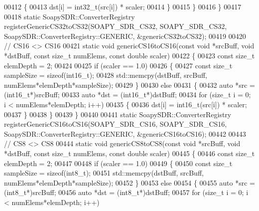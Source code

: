 \begin{DoxyCode}
00412     \{
00413       dst[i] = int32\_t(src[i]) * scaler;
00414     \}
00415     \}
00416 \}
00417 
00418 \textcolor{keyword}{static} SoapySDR::ConverterRegistry registerGenericCS32toCS32(SOAPY_SDR_CS32, 
      SOAPY_SDR_CS32, SoapySDR::ConverterRegistry::GENERIC, &genericCS32toCS32);
00419 
00420 \textcolor{comment}{// CS16 <> CS16}
00421 \textcolor{keyword}{static} \textcolor{keywordtype}{void} genericCS16toCS16(\textcolor{keyword}{const} \textcolor{keywordtype}{void} *srcBuff, \textcolor{keywordtype}{void} *dstBuff, \textcolor{keyword}{const} \textcolor{keywordtype}{size\_t} numElems, \textcolor{keyword}{const} \textcolor{keywordtype}{double} 
      scaler)
00422 \{
00423   \textcolor{keyword}{const} \textcolor{keywordtype}{size\_t} elemDepth = 2;
00424 
00425   \textcolor{keywordflow}{if} (scaler == 1.0)
00426     \{
00427       \textcolor{keyword}{const} \textcolor{keywordtype}{size\_t} sampleSize = \textcolor{keyword}{sizeof}(int16\_t);
00428       std::memcpy(dstBuff, srcBuff, numElems*elemDepth*sampleSize);
00429     \}
00430   \textcolor{keywordflow}{else}
00431     \{
00432       \textcolor{keyword}{auto} *src = (int16\_t*)srcBuff;
00433       \textcolor{keyword}{auto} *dst = (int16\_t*)dstBuff;
00434       \textcolor{keywordflow}{for} (\textcolor{keywordtype}{size\_t} i = 0; i < numElems*elemDepth; i++)
00435     \{
00436       dst[i] = int16\_t(src[i]) * scaler;
00437     \}
00438     \}
00439 \}
00440 
00441 \textcolor{keyword}{static} SoapySDR::ConverterRegistry registerGenericCS16toCS16(SOAPY_SDR_CS16, 
      SOAPY_SDR_CS16, SoapySDR::ConverterRegistry::GENERIC, &genericCS16toCS16);
00442 
00443 \textcolor{comment}{// CS8 <> CS8}
00444 \textcolor{keyword}{static} \textcolor{keywordtype}{void} genericCS8toCS8(\textcolor{keyword}{const} \textcolor{keywordtype}{void} *srcBuff, \textcolor{keywordtype}{void} *dstBuff, \textcolor{keyword}{const} \textcolor{keywordtype}{size\_t} numElems, \textcolor{keyword}{const} \textcolor{keywordtype}{double} scaler)
00445 \{
00446   \textcolor{keyword}{const} \textcolor{keywordtype}{size\_t} elemDepth = 2;
00447 
00448   \textcolor{keywordflow}{if} (scaler == 1.0)
00449     \{
00450       \textcolor{keyword}{const} \textcolor{keywordtype}{size\_t} sampleSize = \textcolor{keyword}{sizeof}(int8\_t);
00451       std::memcpy(dstBuff, srcBuff, numElems*elemDepth*sampleSize);
00452     \}
00453   \textcolor{keywordflow}{else}
00454     \{
00455       \textcolor{keyword}{auto} *src = (int8\_t*)srcBuff;
00456       \textcolor{keyword}{auto} *dst = (int8\_t*)dstBuff;
00457       \textcolor{keywordflow}{for} (\textcolor{keywordtype}{size\_t} i = 0; i < numElems*elemDepth; i++)

\end{DoxyCode}
